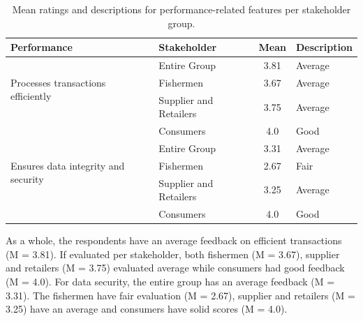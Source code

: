 	\vspace{1cm}
	\begin{table}[h]
		\centering
		\begin{tabular}{|l|l|c|l|}
			\hline
			\textbf{Performance} & \textbf{Stakeholder} & \textbf{Mean} & \textbf{Description} \\ \hline
			\multirow{3}{*}{Processes transactions efficiently} 
			& Entire Group & 3.81 & Average \\ \cline{2-4}
			& Fishermen & 3.67 & Average \\ \cline{2-4}
			& Supplier and Retailers & 3.75 & Average \\ \cline{2-4}
			& Consumers & 4.0 & Good \\ \hline
			
			\multirow{3}{*}{Ensures data integrity and security} 
			& Entire Group & 3.31 & Average \\ \cline{2-4}
			& Fishermen & 2.67 & Fair \\ \cline{2-4}
			& Supplier and Retailers & 3.25 & Average \\ \cline{2-4}
			& Consumers & 4.0 & Good \\ \hline
			
		\end{tabular}
		\caption{Mean ratings and descriptions for performance-related features per stakeholder group.}
		\label{tab:performance}
	\end{table}
	
	As a whole, the respondents have an average feedback on efficient transactions (M = 3.81). If evaluated per stakeholder, both fishermen (M = 3.67), supplier and retailers (M = 3.75) evaluated average while consumers had good feedback (M = 4.0). For data security, the entire group has an average feedback (M = 3.31). The fishermen have fair evaluation (M = 2.67), supplier and retailers (M = 3.25) have an average and consumers have solid scores (M = 4.0).
	
	
	
